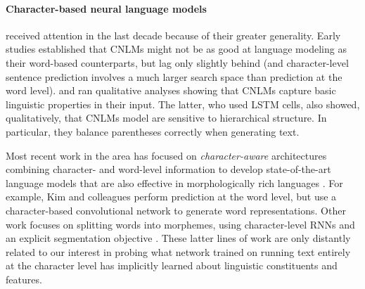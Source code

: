 \paragraph{Character-based neural language models} received attention in the last
decade because of their greater generality. %
Early studies
\cite{Mikolov:etal:2011,Sutskever:etal:2011,DBLP:journals/corr/Graves13}
established that CNLMs might not be as good at language modeling as
their word-based counterparts, but lag only slightly behind (and
character-level sentence prediction involves a much larger search
space than prediction at the word
level).  and
 ran qualitative analyses showing
that CNLMs capture basic linguistic properties in their input. The
latter, who used LSTM cells, also showed, qualitatively, that CNLMs model are sensitive to
hierarchical structure. In particular, they balance parentheses
correctly when generating text. %

Most recent work in the area has focused on \emph{character-aware}
architectures combining character- and word-level information to
develop state-of-the-art language models that are also effective in
morphologically rich languages
\citep[e.g.,][]{Bojanowski:etal:2016,Kim:etal:2016,Gerz:etal:2018}. For
example, Kim and colleagues perform prediction at the word level, but
use a character-based convolutional network to generate word
representations. Other work focuses on splitting words into morphemes,
using character-level RNNs and an explicit segmentation objective
\cite[e.g.,][]{Kann:etal:2016}. These latter lines of work are only
distantly related to our interest in probing what network trained on
running text entirely at the character level has implicitly learned about
linguistic constituents and features.


